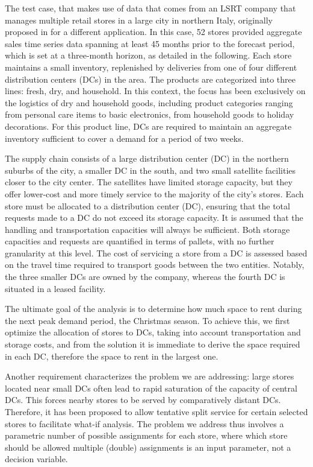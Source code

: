 \documentclass[ijoc,sglanonrev]{informs4}
\begin{document}
The test case, that makes use of data that comes from an LSRT company that manages multiple retail stores in a large city in northern Italy, originally proposed in \citet{MZ23} for a different application. In this case, 52 stores provided aggregate sales time series data spanning at least 45 months prior to the forecast period, which is set at a three-month horizon, as detailed in the following. Each store maintains a small inventory, replenished by deliveries from one of four different distribution centers (DCs) in the area. The products are categorized into three lines: fresh, dry, and household. In this context, the focus has been exclusively on the logistics of dry and household goods, including product categories ranging from personal care items to basic electronics, from household goods to holiday decorations. For this product line, DCs are required to maintain an aggregate inventory sufficient to cover a demand for a period of two weeks.

The supply chain consists of a large distribution center (DC) in the northern suburbs of the city, a smaller DC in the south, and two small satellite facilities closer to the city center. The satellites have limited storage capacity, but they offer lower-cost and more timely service to the majority of the city's stores. 
Each store must be allocated to a distribution center (DC), ensuring that the total requests made to a DC do not exceed its storage capacity. It is assumed that the handling and transportation capacities will always be sufficient. Both storage capacities and requests are quantified in terms of pallets, with no further granularity at this level. The cost of servicing a store from a DC is assessed based on the travel time required to transport goods between the two entities. Notably, the three smaller DCs are owned by the company, whereas the fourth DC is situated in a leased facility.

The ultimate goal of the analysis is to determine how much space to rent during the next peak demand period, the Christmas season. To achieve this, we first optimize the allocation of stores to DCs, taking into account transportation and storage costs, and from the solution it is immediate to derive the space required in each DC, therefore the space to rent in the largest one.

Another requirement characterizes the problem we are addressing: large stores located near small DCs often lead to rapid saturation of the capacity of central DCs. This forces nearby stores to be served by comparatively distant DCs. Therefore, it has been proposed to allow tentative split service for certain selected stores to facilitate what-if analysis. The problem we address thus involves a parametric number of possible assignments for each store, where which store should be allowed multiple (double) assignments is an input parameter, not a decision variable.  
\end{document}
